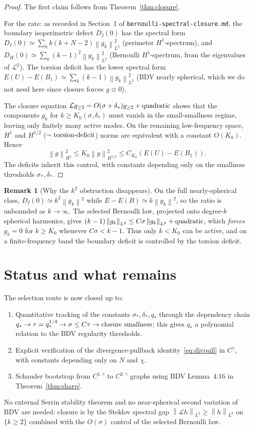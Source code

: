 \documentclass[11pt]{article}
\theoremstyle{definition}
\newtheorem{remark}[theorem]{Remark}
\newcommand{\norm}[1]{\left\|#1\right\|}
\begin{document}
\begin{proof}
The first claim follows from Theorem~\ref{thm:closure}.

For the rate: as recorded in Section~1 of \texttt{bernoulli-spectral-closure.md}, the boundary
isoperimetric defect $D_I(0)$ has the spectral form
$D_I(0)\simeq\sum_k k(k+N-2)\norm{g_k}_{L^2}^2$ (perimeter $H^1$-spectrum), and
$D_H(0)\simeq\sum_k(k-1)^2\norm{g_k}_{L^2}^2$ (Bernoulli $H^1$-spectrum, from
the eigenvalues of $\mathcal L^2$). The torsion deficit has the lower
spectral form $E(U)-E(B_1)\simeq\sum_k(k-1)\norm{g_k}_{L^2}^2$ (BDV nearly
spherical, which we do not need here since closure forces $g\equiv0$).

The closure equation $\mathcal Lg_{\ge2}=O(\sigma+\delta_*)g_{\ge2}+\hbox{quadratic}$
shows that the components $g_k$ for $k\ge K_0(\sigma,\delta_*)$ must
vanish in the small-smallness regime, leaving only finitely many active
modes. On the remaining low-frequency space, $H^1$ and $H^{1/2}$
($\sim\hbox{torsion-deficit}$) norms are equivalent with a constant
$O(K_0)$. Hence
\[
\norm{g}_{H^1}^2\le K_0\norm{g}_{H^{1/2}}^2\le C_{K_0}(E(U)-E(B_1)).
\]
The deficits inherit this control, with constants depending only on the
smallness thresholds $\sigma_*,\delta_*$.
\end{proof}

\begin{remark}[Why the $k^2$ obstruction disappears]
On the full nearly-spherical class, $D_I(0)\simeq k^2\norm{g_k}^2$ while
$E-E(B)\simeq k\norm{g_k}^2$, so the ratio is unbounded as $k\to\infty$. The
selected Bernoulli law, projected onto degree-$k$ spherical harmonics, gives
$(k-1)\norm{g_k}_{L^2}\le C\sigma\norm{g_k}_{L^2}+\hbox{quadratic}$, which
\emph{forces} $g_k=0$ for $k\ge K_0$ whenever $C\sigma<k-1$. Thus only
$k<K_0$ can be active, and on a finite-frequency band the boundary deficit
is controlled by the torsion deficit.
\end{remark}

\section{Status and what remains}

The selection route is now closed up to:
\begin{enumerate}
\item Quantitative tracking of the constants $\sigma_*,\delta_*,q_*$
through the dependency chain
$q_*\to\tau=q_*^{1/4}\to\sigma\le C\tau\to\hbox{closure smallness}$;
this gives $q_*$ a polynomial relation to the BDV regularity thresholds.

\item Explicit verification of the divergence-pullback
identity~\eqref{eq:divpull} in $C^\gamma$, with constants depending only on
$N$ and $\chi$.

\item Schauder bootstrap from $C^{1,\gamma}$ to $C^{2,\gamma}$ graphs using
BDV Lemma~4.16 in Theorem~\ref{thm:sharp}.
\end{enumerate}

No external Serrin stability theorem and no near-spherical second variation
of BDV are needed: closure is by the Steklov spectral gap
$\norm{\mathcal Lh}_{L^2}\ge\norm{h}_{L^2}$ on $\{k\ge2\}$ combined with the
$O(\sigma)$ control of the selected Bernoulli law.
\end{document}
